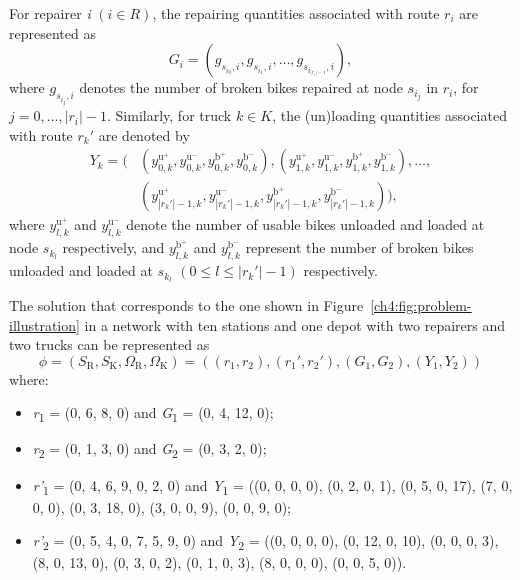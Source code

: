 For repairer \emph{i} \(\left( {i \in R} \right)\), the repairing quantities associated with route
\(r_{i}\) are represented as
\begin{equation}
G_{i} = \left( g_{s_{i_{0}},i},g_{s_{i_{1}},i},\ldots,g_{s_{i_{|r_{i}| - 1}},i} \right),
\end{equation}
where \(g_{s_{i_{j}},i}\) denotes the number of broken bikes repaired at node \(s_{i_{j}}\) in
\(r_{i}\), for \(j=0,\ldots,\left| r_{i} \right|-1\). Similarly, for truck \(k\in K\), the
(un)loading quantities associated with route \(r_{k}'\) are
denoted by
\begin{equation}
\begin{aligned}
Y_{k} = \big(&
(y_{0,k}^{\text{u}^{+}},y_{0,k}^{\text{u}^{-}},y_{0,k}^{\text{b}^{+}},y_{0,k}^{\text{b}^{-}}),
(y_{1,k}^{\text{u}^{+}},y_{1,k}^{\text{u}^{-}},y_{1,k}^{\text{b}^{+}},y_{1,k}^{\text{b}^{-}}),
\ldots, \\
& (y_{|r_{k}'|-1,k}^{\text{u}^{+}},y_{|r_{k}'|-1,k}^{\text{u}^{-}},
y_{|r_{k}'|-1,k}^{\text{b}^{+}},y_{|r_{k}'|-1,k}^{\text{b}^{-}})
\big),
\end{aligned}
\end{equation}
where \(y_{l,k}^{\text{u}^{+}}\) and \(y_{l,k}^{\text{u}^{-}}\) denote the number of usable bikes
unloaded and loaded at node \(s_{k_{l}}\) respectively, and \(y_{l,k}^{\text{b}^{+}}\) and
\(y_{l,k}^{\text{b}^{-}}\) represent the number of broken bikes unloaded and loaded at \(s_{k_{l}}\)
\(\left( {0 \leq l \leq \left| r_{k}' \right| - 1} \right)\) respectively.

The solution that corresponds to the one shown in Figure~\ref{ch4:fig:problem-illustration} in a network with ten stations and one
depot with two repairers and two trucks can be represented
as
\begin{equation}
\phi = \left( {S_{\text{R}},S_{\text{K}},\Omega_{\text{R}},\Omega_{\text{K}}} \right)
= \left( {\left( {r_{1},r_{2}} \right),\left( {r_{1}',r_{2}'} \right),
\left( {G_{1},G_{2}} \right),\left( {Y_{1},Y_{2}} \right)} \right)
\end{equation}
where:

\begin{itemize}
\item
  \emph{r}\textsubscript{1} = (0, 6, 8, 0) and \emph{G}\textsubscript{1} = (0, 4, 12, 0);
\item
  \emph{r}\textsubscript{2} = (0, 1, 3, 0) and \emph{G}\textsubscript{2} = (0, 3, 2, 0);
\item
  \emph{r'}\textsubscript{1} = (0, 4, 6, 9, 0, 2, 0) and \emph{Y}\textsubscript{1} = ((0, 0, 0, 0),
  (0, 2, 0, 1), (0, 5, 0, 17), (7, 0, 0, 0), (0, 3, 18, 0), (3, 0, 0, 9), (0, 0, 9, 0);
\item
  \emph{r'}\textsubscript{2} = (0, 5, 4, 0, 7, 5, 9, 0) and \emph{Y}\textsubscript{2} = ((0, 0, 0,
  0), (0, 12, 0, 10), (0, 0, 0, 3), (8, 0, 13, 0), (0, 3, 0, 2), (0, 1, 0, 3), (8, 0, 0, 0), (0, 0,
  5, 0)).
\end{itemize}

